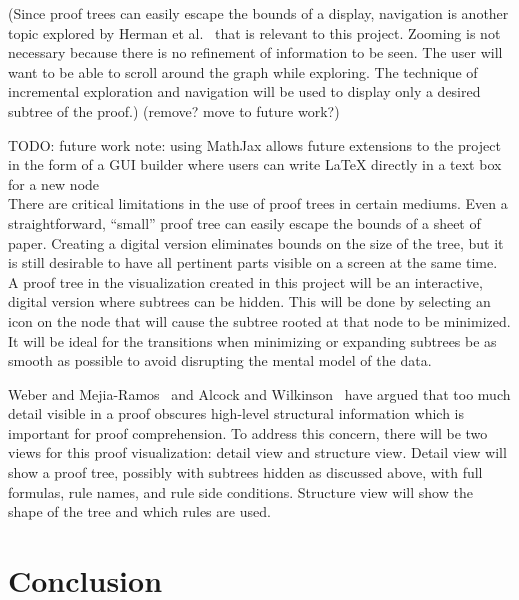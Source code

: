 \documentclass[conference]{IEEEtran}
\begin{document}
(Since proof trees can easily escape the bounds of a display, navigation is another topic explored by Herman et al.~\cite{graphvis-herman+melancon+marshall} that is relevant to this project. Zooming is not necessary because there is no refinement of information to be seen. The user will want to be able to scroll around the graph while exploring. The technique of incremental exploration and navigation will be used to display only a desired subtree of the proof.) (remove? move to future work?)

TODO: future work note: using MathJax allows future extensions to the project in the form of a GUI builder where users can write LaTeX directly in a text box for a new node \\

There are critical limitations in the use of proof trees in certain mediums. Even a straightforward, ``small'' proof tree can easily escape the bounds of a sheet of paper. Creating a digital version eliminates bounds on the size of the tree, but it is still desirable to have all pertinent parts visible on a screen at the same time. A proof tree in the visualization created in this project will be an interactive, digital version where subtrees can be hidden. This will be done by selecting an icon on the node that will cause the subtree rooted at that node to be minimized. It will be ideal for the transitions when minimizing or expanding subtrees be as smooth as possible to avoid disrupting the mental model of the data.

Weber and Mejia-Ramos~\cite{majorsbeliefs-weber+mejiaramos} and Alcock and Wilkinson~\cite{eproofs-alcock+wilkinson} have argued that too much detail visible in a proof obscures high-level structural information which is important for proof comprehension. To address this concern, there will be two views for this proof visualization: detail view and structure view. Detail view will show a proof tree, possibly with subtrees hidden as discussed above, with full formulas, rule names, and rule side conditions. Structure view will show the shape of the tree and which rules are used.

\section{Conclusion}
\label{sec:conclusion}

\end{document}
